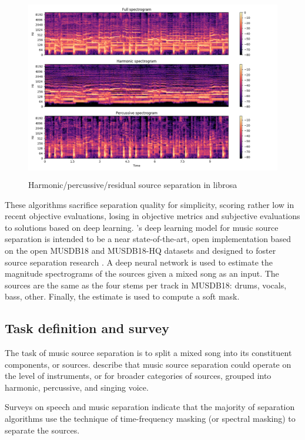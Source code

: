 \documentclass[letter,12pt,notitlepage]{article}
\begin{document}
\begin{figure}[ht]
	\centering
	\includegraphics[height=8cm]{./sphx_glr_plot_hprss_001.png}
	\caption{Harmonic/percussive/residual source separation in librosa}
	\label{fig:hpsslibrosa}
\end{figure}


These algorithms sacrifice separation quality for simplicity, scoring rather low in recent objective evaluations\cite{sisec2018}, losing in objective metrics and subjective evaluations to solutions based on deep learning\cite{umx, demucs}. \citet{umx}'s deep learning model for music source separation is intended to be a near state-of-the-art, open implementation based on the open MUSDB18 and MUSDB18-HQ datasets and designed to foster source separation research \cite{musdb18, musdb18hq}. A deep neural network is used to estimate the magnitude spectrograms of the sources given a mixed song as an input. The sources are the same as the four stems per track in MUSDB18: drums, vocals, bass, other. Finally, the estimate is used to compute a soft mask.

\subsection{Task definition and survey}

The task of music source separation is to split a mixed song into its constituent components, or sources. \citet{musicsepgood} describe that music source separation could operate on the level of instruments, or for broader categories of sources, grouped into harmonic, percussive, and singing voice.


Surveys on speech \cite{speechmask} and music separation \cite{musicmask} indicate that the majority of separation algorithms use the technique of time-frequency masking (or spectral masking) to separate the sources.
\end{document}
